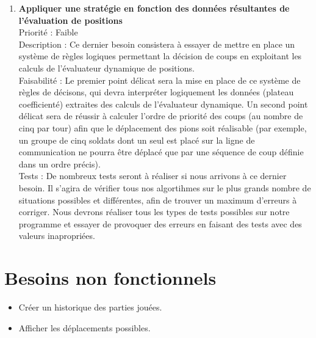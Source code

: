 \documentclass[12pt]{article}
\begin{document}
			\begin{enumerate}

				\item \textbf{Appliquer une stratégie en fonction des données résultantes de l'évaluation de positions} \\[0.7\baselineskip]
				Priorité : Faible \\[0.7\baselineskip]
				Description : Ce dernier besoin consistera à essayer de mettre en place un système de règles logiques permettant la décision de coups en exploitant les calculs de l'évaluateur dynamique de positions. \\[0.7\baselineskip]
				Faisabilité : Le premier point délicat sera la mise en place de ce système de règles de décisons, qui devra interpréter logiquement les données (plateau coefficienté) extraites des calculs de l'évaluateur dynamique. Un second point délicat sera de réussir à calculer l'ordre de priorité des coups (au nombre de cinq par tour) afin que le déplacement des pions soit réalisable (par exemple, un groupe de cinq soldats dont un seul est placé sur la ligne de communication ne pourra être déplacé que par une séquence de coup définie dans un ordre précis). \\[0.7\baselineskip]
				Tests : De nombreux tests seront à réaliser si nous arrivons à ce dernier besoin. Il s'agira de vérifier tous nos algortihmes sur le plus grands nombre de situations possibles et différentes, afin de trouver un maximum d'erreurs à corriger. Nous devrons réaliser tous les types de tests possibles sur notre programme et essayer de provoquer des erreurs en faisant des tests avec des valeurs inapropriées. \\[0.7\baselineskip]
				
			\end{enumerate}

	\section{Besoins non fonctionnels} 

		\begin{itemize}
			\item Créer un historique des parties jouées.
			\item Afficher les déplacements possibles.
		\end{itemize}
\end{document}
